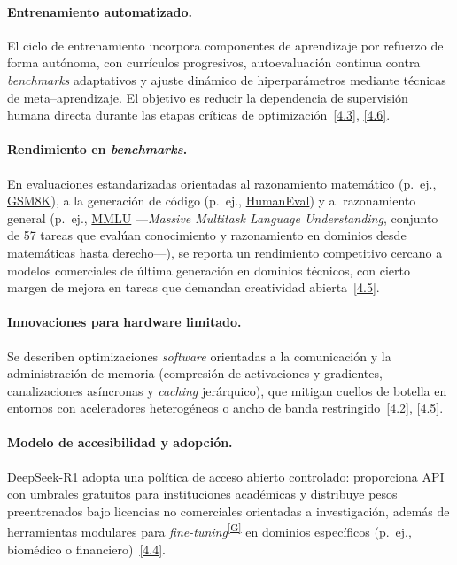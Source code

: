 \documentclass[12pt,a4paper]{report}
\numberwithin{figure}{section}
\begin{document}
\paragraph{Entrenamiento automatizado.}
El ciclo de entrenamiento incorpora componentes de aprendizaje por refuerzo de forma autónoma, con currículos progresivos, autoevaluación continua contra \textit{benchmarks} adaptativos y ajuste dinámico de hiperparámetros mediante técnicas de meta–aprendizaje. El objetivo es reducir la dependencia de supervisión humana directa durante las etapas críticas de optimización~\hyperref[ref:4.3]{[4.3]}, \hyperref[ref:4.6]{[4.6]}.

\paragraph{Rendimiento en \textit{benchmarks}.}
En evaluaciones estandarizadas orientadas al razonamiento matemático (p.~ej., \href{https://github.com/openai/grade-school-math}{GSM8K}), a la generación de código (p.~ej., \href{https://github.com/openai/human-eval}{HumanEval}) y al razonamiento general (p.~ej., \href{https://github.com/hendrycks/test}{MMLU} ---\textit{Massive Multitask Language Understanding}, conjunto de 57 tareas que evalúan conocimiento y razonamiento en dominios desde matemáticas hasta derecho---), se reporta un rendimiento competitivo cercano a modelos comerciales de última generación en dominios técnicos, con cierto margen de mejora en tareas que demandan creatividad abierta~\hyperref[ref:4.5]{[4.5]}.

\paragraph{Innovaciones para hardware limitado.}
Se describen optimizaciones \textit{software} orientadas a la comunicación y la administración de memoria (compresión de activaciones y gradientes, canalizaciones asíncronas y \textit{caching} jerárquico), que mitigan cuellos de botella en entornos con aceleradores heterogéneos o ancho de banda restringido~\hyperref[ref:4.2]{[4.2]}, \hyperref[ref:4.5]{[4.5]}.

\paragraph{Modelo de accesibilidad y adopción.}
DeepSeek-R1 adopta una política de acceso abierto controlado: proporciona API con umbrales gratuitos para instituciones académicas y distribuye pesos preentrenados bajo licencias no comerciales orientadas a investigación, además de herramientas modulares para \textit{fine-tuning}\textsuperscript{\hyperref[glos:finetuning]{[G]}} en dominios específicos (p.~ej., biomédico o financiero)~\hyperref[ref:4.4]{[4.4]}.
\end{document}
